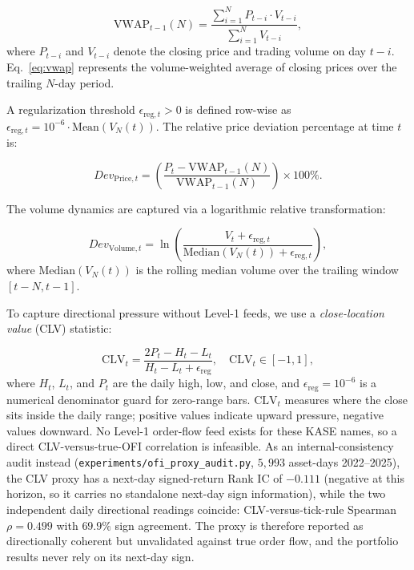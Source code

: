 \documentclass[pdflatex,sn-mathphys-num]{sn-jnl}
\theoremstyle{thmstyleone}
\theoremstyle{thmstyletwo}
\theoremstyle{thmstylethree}
\begin{document}
\begin{equation}
    \mathrm{VWAP}_{t-1}(N) = \frac{\sum_{i=1}^{N} P_{t-i} \cdot V_{t-i}}{\sum_{i=1}^{N} V_{t-i}},
    \label{eq:vwap}
\end{equation}
where $P_{t-i}$ and $V_{t-i}$ denote the closing price and trading volume on day $t-i$. Eq.~\eqref{eq:vwap} represents the volume-weighted average of closing prices over the trailing $N$-day period.

A regularization threshold $\epsilon_{\mathrm{reg},t} > 0$ is defined row-wise as $\epsilon_{\mathrm{reg},t} = 10^{-6} \cdot \mathrm{Mean}(V_N(t))$. The relative price deviation percentage at time $t$ is:

\begin{equation}
    Dev_{\mathrm{Price},t} = \left( \frac{P_t - \mathrm{VWAP}_{t-1}(N)}{\mathrm{VWAP}_{t-1}(N)} \right) \times 100\%.
    \label{eq:devprice}
\end{equation}

The volume dynamics are captured via a logarithmic relative transformation:

\begin{equation}
    Dev_{\mathrm{Volume},t} = \ln \left( \frac{V_t + \epsilon_{\mathrm{reg},t}}{\mathrm{Median}(V_N(t)) + \epsilon_{\mathrm{reg},t}} \right),
    \label{eq:devvol}
\end{equation}
where $\mathrm{Median}(V_N(t))$ is the rolling median volume over the trailing window $[t-N, t-1]$.

To capture directional pressure without Level-1 feeds, we use a \emph{close-location value} (CLV) statistic:

\begin{equation}
    \mathrm{CLV}_t = \frac{2 P_t - H_t - L_t}{H_t - L_t + \epsilon_{\mathrm{reg}}}, \quad \mathrm{CLV}_t \in [-1, 1],
    \label{eq:clv}
\end{equation}
where $H_t$, $L_t$, and $P_t$ are the daily high, low, and close, and $\epsilon_{\mathrm{reg}}=10^{-6}$ is a numerical denominator guard for zero-range bars. $\mathrm{CLV}_t$ measures where the close sits inside the daily range; positive values indicate upward pressure, negative values downward. No Level-1 order-flow feed exists for these KASE names, so a direct CLV-versus-true-OFI correlation is infeasible. As an internal-consistency audit instead (\texttt{experiments/ofi\_proxy\_audit.py}, $5{,}993$ asset-days 2022--2025), the CLV proxy has a next-day signed-return Rank IC of $-0.111$ (negative at this horizon, so it carries no standalone next-day sign information), while the two independent daily directional readings coincide: CLV-versus-tick-rule Spearman $\rho = 0.499$ with $69.9\%$ sign agreement. The proxy is therefore reported as directionally coherent but unvalidated against true order flow, and the portfolio results never rely on its next-day sign.
\end{document}

